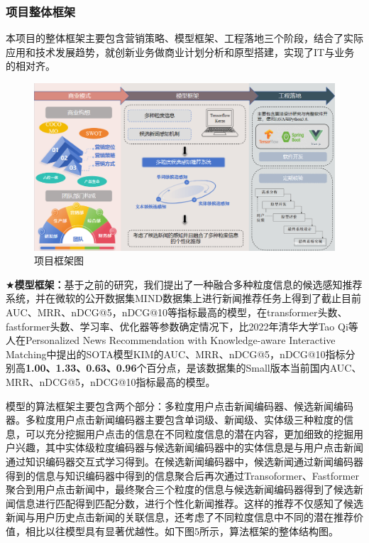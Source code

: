 \documentclass[withoutpreface,bwprint]{cumcmthesis} %
\begin{document}
	\subsubsection{ 项目整体框架}
	本项目的整体框架主要包含营销策略、模型框架、工程落地三个阶段，结合了实际应用和技术发展趋势，就创新业务做商业计划分析和原型搭建，实现了IT与业务的相对齐。\par
	\begin{figure}[H]
		\includegraphics[width=1.0\textwidth]{框架}
		\caption{项目框架图}
		\label{fig:circuit-diagcam}
	\end{figure}
		$\bigstar$\textbf{模型框架：}基于之前的研究，我们提出了一种融合多种粒度信息的候选感知推荐系统，并在微软的公开数据集MIND数据集上进行新闻推荐任务上得到了截止目前AUC、MRR、nDCG@5，nDCG@10等指标最高的模型，在transformer头数、fastformer头数、学习率、优化器等参数确定情况下，比2022年清华大学Tao Qi等人在Personalized News Recommendation with Knowledge-aware Interactive Matching中提出的SOTA模型KIM的AUC、MRR、nDCG@5，nDCG@10指标分别高\textbf{1.00、1.33、0.63、0.96}个百分点，是该数据集的Small版本当前国内AUC、MRR、nDCG@5，nDCG@10指标最高的模型。\par
		模型的算法框架主要包含两个部分：多粒度用户点击新闻编码器、候选新闻编码器。多粒度用户点击新闻编码器主要包含单词级、新闻级、实体级三种粒度的信息，可以充分挖掘用户点击的信息在不同粒度信息的潜在内容，更加细致的挖掘用户兴趣，其中实体级粒度编码器与候选新闻编码器中的实体信息是与用户点击新闻通过知识编码器交互式学习得到。在候选新闻编码器中，候选新闻通过新闻编码器得到的信息与知识编码器中得到的信息聚合后再次通过Transoformer、Fastformer聚合到用户点击新闻中，最终聚合三个粒度的信息与候选新闻编码器得到了候选新闻信息进行匹配得到匹配分数，进行个性化新闻推荐。这样的推荐不仅感知了候选新闻与用户历史点击新闻的关联信息，还考虑了不同粒度信息中不同的潜在推荐价值，相比以往模型具有显著优越性。如下图5所示，算法框架的整体结构图。\par
\end{document}
